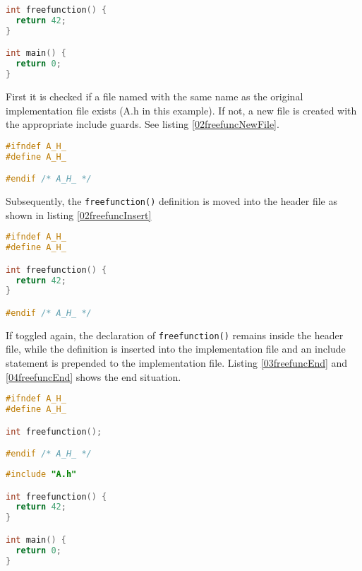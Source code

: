 \begin{lstlisting}[caption={A.cpp},label={01freefuncPre},language=C++]
int freefunction() {
  return 42;
}

int main() {
  return 0;
}
\end{lstlisting}

First it is checked if a file named with the same name as the original
implementation file exists (A.h in this example). If not, a new file is created with the
appropriate include guards. See listing \nolinebreak\ref{02freefuncNewFile}.

\begin{lstlisting}[caption={Newly created A.h}, label={02freefuncNewFile},
language=C++]
#ifndef A_H_
#define A_H_

#endif /* A_H_ */
\end{lstlisting}

Subsequently, the \texttt{freefunction()} definition is moved into the header
file as shown in listing \nolinebreak\ref{02freefuncInsert}

\begin{lstlisting}[caption={Inserted \texttt{freefunction()} in A.h},
label={02freefuncInsert}, language=C++]
#ifndef A_H_
#define A_H_

int freefunction() {
  return 42;
}

#endif /* A_H_ */
\end{lstlisting}

If toggled again, the declaration of \texttt{freefunction()} remains inside the
header file, while the definition is inserted into the implementation file and an
include statement is prepended to the implementation file. Listing
\nolinebreak\ref{03freefuncEnd} and \ref{04freefuncEnd} shows the end
situation.

\vspace{0.5cm}
\begin{minipage}{.48\textwidth}
\lstset{xrightmargin=0.5cm}
\begin{lstlisting}[caption={Inserted freefunction in A.h},
label={03freefuncEnd}, language=C++]
#ifndef A_H_
#define A_H_

int freefunction();

#endif /* A_H_ */
\end{lstlisting}
\end{minipage}%
\begin{minipage}{.48\textwidth}
\lstset{xleftmargin=0.5cm}
\begin{lstlisting}[caption={A.cpp},label={04freefuncEnd},language=C++]
#include "A.h"

int freefunction() {
  return 42;
}

int main() {
  return 0;
}
\end{lstlisting}
\end{minipage}

